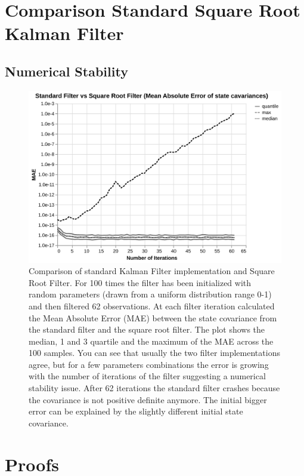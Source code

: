 \documentclass{article}
\let\Oldsection\section
\renewcommand{\section}{\FloatBarrier\Oldsection}
\let\Oldsubsection\subsection
\renewcommand{\subsection}{\FloatBarrier\Oldsubsection}
\begin{document}
\section{Comparison Standard Square Root Kalman Filter}

\subsection{Numerical Stability}

\begin{figure}
\includegraphics[width=\textwidth]{numerical_stability}
 \caption{Comparison of standard Kalman Filter implementation and Square Root Filter. For 100 times the filter has been initialized with random parameters (drawn from a uniform distribution range 0-1) and then filtered 62 observations. At each filter iteration calculated the Mean Absolute Error (MAE) between the state covariance from the standard filter and the square root filter. The plot shows the median, 1 and 3 quartile and the maximum of the MAE across the 100 samples. You can see that usually the two filter implementations agree, but for a few parameters combinations the error is growing with the number of iterations of the filter suggesting a numerical stability issue. After 62 iterations the standard filter crashes because the covariance is not positive definite anymore. The initial bigger error can be explained by the slightly different initial state covariance.}
\end{figure}


\section{Proofs}
\end{document}
